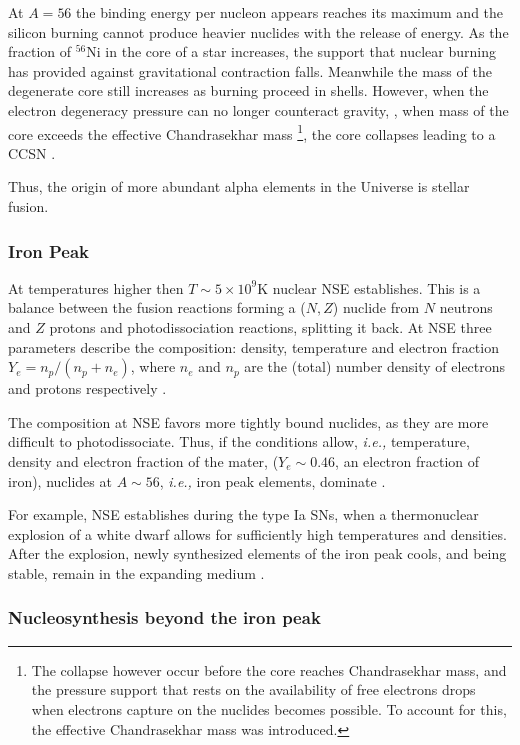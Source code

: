 At $A=56$ the binding energy per nucleon appears reaches its maximum and the silicon burning cannot produce heavier nuclides with the release of energy. As the fraction of $^{56}$Ni in the core of a star increases, the support that nuclear burning has provided against gravitational contraction falls. Meanwhile the mass of the degenerate core still increases as burning proceed in shells. However, when the electron degeneracy pressure can no longer counteract gravity, \ie, when mass of the core exceeds the effective Chandrasekhar mass \footnote{The collapse however occur before the core reaches Chandrasekhar mass, and the pressure support that rests on the availability of free electrons drops when electrons capture on the nuclides becomes possible. To account for this, the effective Chandrasekhar mass was introduced.}, the core collapses leading to a \ac{CCSN} \cite{Woosley:2002}.

Thus, the origin of more abundant alpha elements in the Universe is stellar fusion.


\subsubsection{Iron Peak}

At temperatures higher then $T\sim 5\times10^{9}$K nuclear \ac{NSE} establishes. This is a balance between the fusion reactions forming a ($N,Z$) nuclide from $N$ neutrons and $Z$ protons and photodissociation reactions, splitting it back. At \ac{NSE} three parameters describe the composition: 
density, temperature and electron fraction $Y_e = n_p/(n_p + n_e)$, where $n_e$ and $n_p$ are the (total) 
number density of electrons and protons respectively \citep{Seitenzahl:2009}. 

The composition at \ac{NSE} favors more tightly bound nuclides, as they are more difficult to photodissociate. Thus, if the conditions allow, \textit{i.e.,} temperature, density and electron fraction of the mater, ($Y_e \sim 0.46$, an electron fraction of iron), nuclides at $A\sim56$, \textit{i.e.,} iron peak elements, dominate \citep{Seitenzahl:2009}. 

For example, \ac{NSE} establishes during the type Ia \acp{SN}, when a thermonuclear explosion of a white dwarf allows for sufficiently high temperatures and densities. After the explosion, newly synthesized elements of the iron peak cools, and being stable, remain in the expanding medium \citep{Iwamoto:2000as}.


\subsubsection{Nucleosynthesis beyond the iron peak}

